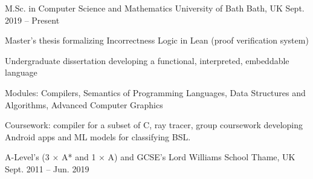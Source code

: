 


\begin{cventries}


\cventry
{M.Sc. in Computer Science and Mathematics} %
{University of Bath} %
{Bath, UK} %
{Sept. 2019 -- Present} %
{ %
\begin{cvitems}
\item {Master's thesis formalizing Incorrectness Logic in Lean (proof verification system)}
\item {Undergraduate dissertation developing a functional, interpreted, embeddable language}
\item {Modules: Compilers, Semantics of Programming Languages, 
  Data Structures and Algorithms, Advanced Computer Graphics}
\item {Coursework: compiler for a subset of C, ray tracer, group 
  coursework developing Android apps and ML models for classifying BSL.}
\end{cvitems}
}

\cventryTwo
{A-Level's (3 $\times$ A* and 1 $\times$ A) and GCSE's} %
{Lord Williams School} %
{Thame, UK} %
{Sept. 2011 -- Jun. 2019} %


\end{cventries}
